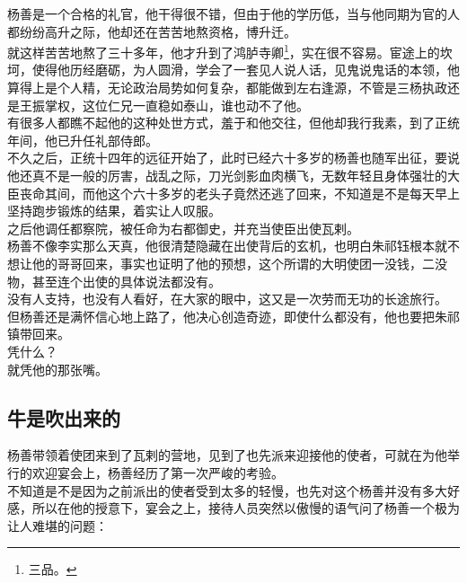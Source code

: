\begin{multicols}{\theparacolNo}
杨善是一个合格的礼官，他干得很不错，但由于他的学历低，当与他同期为官的人都纷纷高升之际，他却还在苦苦地熬资格，博升迁。\\

就这样苦苦地熬了三十多年，他才升到了鸿胪寺卿\footnote{三品。}，实在很不容易。宦途上的坎坷，使得他历经磨砺，为人圆滑，学会了一套见人说人话，见鬼说鬼话的本领，他算得上是个人精，无论政治局势如何复杂，都能做到左右逢源，不管是三杨执政还是王振掌权，这位仁兄一直稳如泰山，谁也动不了他。\\

有很多人都瞧不起他的这种处世方式，羞于和他交往，但他却我行我素，到了正统年间，他已升任礼部侍郎。\\

不久之后，正统十四年的远征开始了，此时已经六十多岁的杨善也随军出征，要说他还真不是一般的厉害，战乱之际，刀光剑影血肉横飞，无数年轻且身体强壮的大臣丧命其间，而他这个六十多岁的老头子竟然还逃了回来，不知道是不是每天早上坚持跑步锻炼的结果，着实让人叹服。\\

之后他调任都察院，被任命为右都御史，并充当使臣出使瓦剌。\\

杨善不像李实那么天真，他很清楚隐藏在出使背后的玄机，也明白朱祁钰根本就不想让他的哥哥回来，事实也证明了他的预想，这个所谓的大明使团一没钱，二没物，甚至连个出使的具体说法都没有。\\

没有人支持，也没有人看好，在大家的眼中，这又是一次劳而无功的长途旅行。\\

但杨善还是满怀信心地上路了，他决心创造奇迹，即使什么都没有，他也要把朱祁镇带回来。\\

凭什么？\\

就凭他的那张嘴。\\

\subsection{牛是吹出来的}
杨善带领着使团来到了瓦剌的营地，见到了也先派来迎接他的使者，可就在为他举行的欢迎宴会上，杨善经历了第一次严峻的考验。\\

不知道是不是因为之前派出的使者受到太多的轻慢，也先对这个杨善并没有多大好感，所以在他的授意下，宴会之上，接待人员突然以傲慢的语气问了杨善一个极为让人难堪的问题：\\


\end{multicols}
